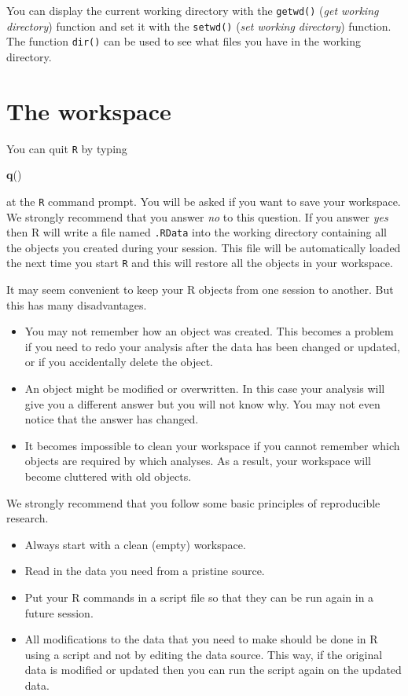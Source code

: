 \documentclass[
]{book}
\newenvironment{Shaded}{\begin{snugshade}}{\end{snugshade}}
\newcommand{\FunctionTok}[1]{\textcolor[rgb]{0.13,0.29,0.53}{\textbf{#1}}}
\newcommand{\NormalTok}[1]{#1}
\providecommand{\tightlist}{%
  \setlength{\itemsep}{0pt}\setlength{\parskip}{0pt}}
\begin{document}
You can display the current working directory with the \texttt{getwd()}
(\emph{get working directory}) function and set it with the \texttt{setwd()}
(\emph{set working directory}) function. The function \texttt{dir()} can be
used to see what files you have in the working directory.

\section{The workspace}\label{the-workspace}

You can quit \texttt{R} by typing

\begin{Shaded}
\begin{Highlighting}[]
\FunctionTok{q}\NormalTok{()}
\end{Highlighting}
\end{Shaded}

at the \texttt{R} command prompt. You will be asked if you want to
save your workspace. We strongly recommend that you answer \emph{no} to this
question. If you answer \emph{yes} then R will write a file named
\texttt{.RData} into the working directory containing all the objects
you created during your session. This file will be automatically loaded
the next time you start \texttt{R} and this will restore all the objects
in your workspace.

It may seem convenient to keep your R objects from one session to another.
But this has many disadvantages.

\begin{itemize}
\tightlist
\item
  You may not remember how an object was created. This becomes a
  problem if you need to redo your analysis after the data has been
  changed or updated, or if you accidentally delete the object.
\item
  An object might be modified or overwritten. In this case your
  analysis will give you a different answer but you will not know why.
  You may not even notice that the answer has changed.
\item
  It becomes impossible to clean your workspace if you cannot
  remember which objects are required by which analyses. As a result,
  your workspace will become cluttered with old objects.
\end{itemize}

We strongly recommend that you follow some basic principles of
reproducible research.

\begin{itemize}
\tightlist
\item
  Always start with a clean (empty) workspace.
\item
  Read in the data you need from a pristine source.
\item
  Put your R commands in a script file so that they can be run
  again in a future session.
\item
  All modifications to the data that you need to make should be
  done in R using a script and not by editing the data source. This
  way, if the original data is modified or updated then you can run
  the script again on the updated data.
\end{itemize}
\end{document}
